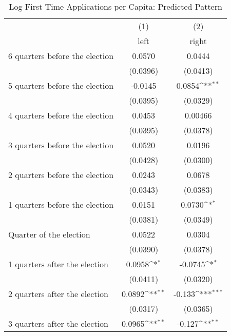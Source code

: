 \begin{table}[htbp]\centering
\def\sym#1{\ifmmode^{#1}\else\(^{#1}\)\fi}
\caption{Log First Time Applications per Capita: Predicted Pattern}
\begin{tabular}{l*{2}{c}}
\hline\hline
                    &\multicolumn{1}{c}{(1)}&\multicolumn{1}{c}{(2)}\\
                    &\multicolumn{1}{c}{left}&\multicolumn{1}{c}{right}\\
\hline
 6 quarters before the election&      0.0570         &      0.0444         \\
                    &    (0.0396)         &    (0.0413)         \\
[1em]
 5 quarters before the election&     -0.0145         &      0.0854\sym{**} \\
                    &    (0.0395)         &    (0.0329)         \\
[1em]
 4 quarters before the election&      0.0453         &     0.00466         \\
                    &    (0.0395)         &    (0.0378)         \\
[1em]
 3 quarters before the election&      0.0520         &      0.0196         \\
                    &    (0.0428)         &    (0.0300)         \\
[1em]
 2 quarters before the election&      0.0243         &      0.0678         \\
                    &    (0.0343)         &    (0.0383)         \\
[1em]
 1 quarters before the election&      0.0151         &      0.0730\sym{*}  \\
                    &    (0.0381)         &    (0.0349)         \\
[1em]
Quarter of the election&      0.0522         &      0.0304         \\
                    &    (0.0390)         &    (0.0378)         \\
[1em]
 1 quarters after the election&      0.0958\sym{*}  &     -0.0745\sym{*}  \\
                    &    (0.0411)         &    (0.0320)         \\
[1em]
 2 quarters after the election&      0.0892\sym{**} &      -0.133\sym{***}\\
                    &    (0.0317)         &    (0.0365)         \\
[1em]
 3 quarters after the election&      0.0965\sym{**} &      -0.127\sym{**} \\

\end{tabular}
\end{table}
